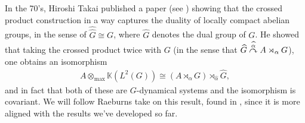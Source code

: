 In the 70's, Hiroshi Takai published a paper (see \cite{takai1975duality}) showing that the crossed product construction in a way captures the duality of locally compact abelian groups, in the sense of $\hat{\hat G} \cong G$, where $\hat G$ denotes the dual group of $G$. He showed that taking the crossed product twice with $G$ (in the sense that $\widehat{G} \stackrel{\widehat{\alpha}}{\curvearrowright} A \rtimes_\alpha G$), one obtains an isomorphism 
\begin{align*}
	A \otimes_{\max} \mathbb{K}(L^2(G)) \cong (A \rtimes_\alpha G) \rtimes_{\hat \alpha} \hat G,
\end{align*}
and in fact that both of these are $G$-dynamical systems and the isomorphism is covariant.  We will follow Raeburns take on this result, found in \cite{raeburn1988crossed}, since it is more aligned with the results we've developed so far.

